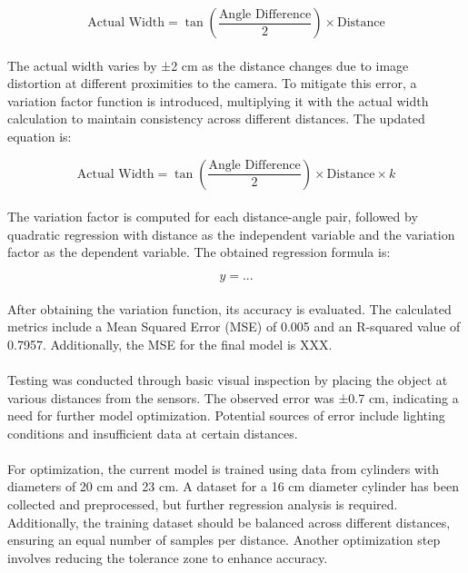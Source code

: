 \begin{equation}
\text{Actual Width} = \tan\left(\frac{\text{Angle Difference}}{2}\right) \times \text{Distance}
\end{equation}

\paragraph{}
The actual width varies by ±2 cm as the distance changes due to image distortion at different proximities to the camera. To mitigate this error, a variation factor function is introduced, multiplying it with the actual width calculation to maintain consistency across different distances. The updated equation is:

\begin{equation}
\text{Actual Width} = \tan\left(\frac{\text{Angle Difference}}{2}\right) \times \text{Distance} \times k
\end{equation}

\paragraph{}
The variation factor is computed for each distance-angle pair, followed by quadratic regression with distance as the independent variable and the variation factor as the dependent variable. The obtained regression formula is:

\begin{equation}
y = ...
\end{equation}

\paragraph{}
After obtaining the variation function, its accuracy is evaluated. The calculated metrics include a Mean Squared Error (MSE) of 0.005 and an R-squared value of 0.7957. Additionally, the MSE for the final model is XXX.

\paragraph{}
Testing was conducted through basic visual inspection by placing the object at various distances from the sensors. The observed error was ±0.7 cm, indicating a need for further model optimization. Potential sources of error include lighting conditions and insufficient data at certain distances.

\paragraph{}
For optimization, the current model is trained using data from cylinders with diameters of 20 cm and 23 cm. A dataset for a 16 cm diameter cylinder has been collected and preprocessed, but further regression analysis is required. Additionally, the training dataset should be balanced across different distances, ensuring an equal number of samples per distance. Another optimization step involves reducing the tolerance zone to enhance accuracy.

